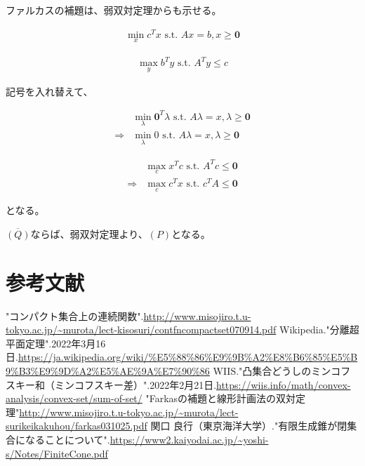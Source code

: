 \documentclass[a4paper, 10pt, dvipdfmx]{jlreq}
\begin{document}
ファルカスの補題は、弱双対定理からも示せる。

\begin{align*}
  \min_{x} c^Tx \text{ s.t. } Ax = b, x \geq \bm{0}
\end{align*}

\begin{align*}
  \max_{y} b^Ty \text{ s.t. } A^Ty \leq c
\end{align*}

記号を入れ替えて、

\begin{align*}
              & \min_{\lambda} \bm{0}^T\lambda \text{ s.t. } A\lambda = x, \lambda \geq \bm{0} \\
  \Rightarrow & \min_{\lambda} 0 \text{ s.t. } A\lambda = x, \lambda \geq \bm{0}
\end{align*}

\begin{align*}
              & \max_{c} x^Tc \text{ s.t. } A^Tc \leq \bm{0} \\
  \Rightarrow & \max_{c} c^Tx \text{ s.t. } c^TA \leq \bm{0}
\end{align*}

となる。

$\overline{(Q)}$ならば、弱双対定理より、$(P)$となる。

\section{参考文献}
\begin{thebibliography}{9}
  "コンパクト集合上の連続関数".\url{http://www.misojiro.t.u-tokyo.ac.jp/~murota/lect-kisosuri/contfncompactset070914.pdf}
  Wikipedia."分離超平面定理".2022年3月16日.\url{https://ja.wikipedia.org/wiki/%E5%88%86%E9%9B%A2%E8%B6%85%E5%B9%B3%E9%9D%A2%E5%AE%9A%E7%90%86}
  WIIS."凸集合どうしのミンコフスキー和（ミンコフスキー差）".2022年2月21日.\url{https://wiis.info/math/convex-analysis/convex-set/sum-of-set/}
  "Farkasの補題と線形計画法の双対定理"\url{http://www.misojiro.t.u-tokyo.ac.jp/~murota/lect-surikeikakuhou/farkas031025.pdf}
  関口 良行（東京海洋大学）."有限生成錐が閉集合になることについて".\url{https://www2.kaiyodai.ac.jp/~yoshi-s/Notes/FiniteCone.pdf}
\end{thebibliography}
\end{document}
